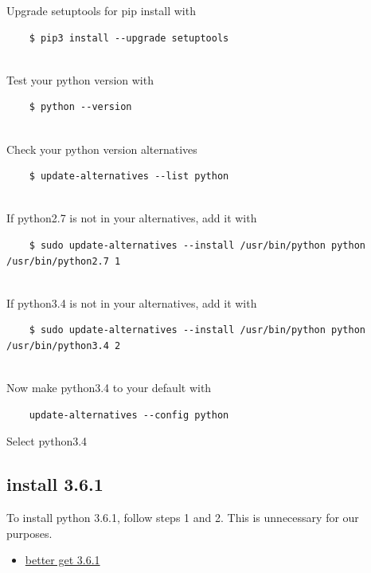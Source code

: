 Upgrade setuptools for pip install with

\begin{verbatim}
    $ pip3 install --upgrade setuptools
    
\end{verbatim}

Test your python version with

\begin{verbatim}
    $ python --version
    
\end{verbatim}

Check your python version alternatives

\begin{verbatim}
    $ update-alternatives --list python
    
\end{verbatim}

If python2.7 is not in your alternatives, add it with

\begin{verbatim}
    $ sudo update-alternatives --install /usr/bin/python python /usr/bin/python2.7 1
    
\end{verbatim}

If python3.4 is not in your alternatives, add it with

\begin{verbatim}
    $ sudo update-alternatives --install /usr/bin/python python /usr/bin/python3.4 2
    
\end{verbatim}

Now make python3.4 to your default with

\begin{verbatim}
    update-alternatives --config python
\end{verbatim}

Select python3.4

\subsection{install 3.6.1}\label{install-3.6.1}

To install python 3.6.1, follow steps 1 and 2. This is unnecessary for
our purposes.

\begin{itemize}
\tightlist
\item
  \href{https://gist.github.com/dschep/24aa61672a2092246eaca2824400d37f}{better
  get 3.6.1}
\end{itemize}

